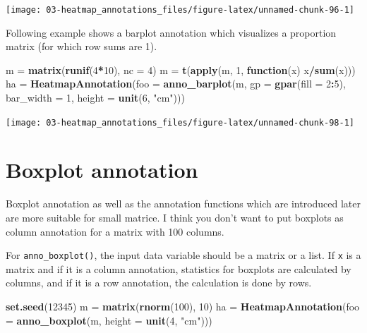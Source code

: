 \documentclass[]{book}
\newenvironment{Shaded}{\begin{snugshade}}{\end{snugshade}}
\newcommand{\KeywordTok}[1]{\textcolor[rgb]{0.13,0.29,0.53}{\textbf{#1}}}
\newcommand{\DataTypeTok}[1]{\textcolor[rgb]{0.13,0.29,0.53}{#1}}
\newcommand{\DecValTok}[1]{\textcolor[rgb]{0.00,0.00,0.81}{#1}}
\newcommand{\StringTok}[1]{\textcolor[rgb]{0.31,0.60,0.02}{#1}}
\newcommand{\ControlFlowTok}[1]{\textcolor[rgb]{0.13,0.29,0.53}{\textbf{#1}}}
\newcommand{\OperatorTok}[1]{\textcolor[rgb]{0.81,0.36,0.00}{\textbf{#1}}}
\newcommand{\NormalTok}[1]{#1}
\theoremstyle{definition}
\theoremstyle{definition}
\theoremstyle{definition}
\theoremstyle{remark}
\begin{document}
\begin{center}\texttt{[image: 03-heatmap\_annotations\_files/figure-latex/unnamed-chunk-96-1]} \end{center}

Following example shows a barplot annotation which visualizes a
proportion matrix (for which row sums are 1).

\begin{Shaded}
\begin{Highlighting}[]
\NormalTok{m =}\StringTok{ }\KeywordTok{matrix}\NormalTok{(}\KeywordTok{runif}\NormalTok{(}\DecValTok{4}\OperatorTok{*}\DecValTok{10}\NormalTok{), }\DataTypeTok{nc =} \DecValTok{4}\NormalTok{)}
\NormalTok{m =}\StringTok{ }\KeywordTok{t}\NormalTok{(}\KeywordTok{apply}\NormalTok{(m, }\DecValTok{1}\NormalTok{, }\ControlFlowTok{function}\NormalTok{(x) x}\OperatorTok{/}\KeywordTok{sum}\NormalTok{(x)))}
\NormalTok{ha =}\StringTok{ }\KeywordTok{HeatmapAnnotation}\NormalTok{(}\DataTypeTok{foo =} \KeywordTok{anno_barplot}\NormalTok{(m, }\DataTypeTok{gp =} \KeywordTok{gpar}\NormalTok{(}\DataTypeTok{fill =} \DecValTok{2}\OperatorTok{:}\DecValTok{5}\NormalTok{), }
    \DataTypeTok{bar_width =} \DecValTok{1}\NormalTok{, }\DataTypeTok{height =} \KeywordTok{unit}\NormalTok{(}\DecValTok{6}\NormalTok{, }\StringTok{"cm"}\NormalTok{)))}
\end{Highlighting}
\end{Shaded}

\begin{center}\texttt{[image: 03-heatmap\_annotations\_files/figure-latex/unnamed-chunk-98-1]} \end{center}

\section{Boxplot annotation}\label{box-annotation}

Boxplot annotation as well as the annotation functions which are
introduced later are more suitable for small matrice. I think you don't
want to put boxplots as column annotation for a matrix with 100 columns.

For \texttt{anno\_boxplot()}, the input data variable should be a matrix
or a list. If \texttt{x} is a matrix and if it is a column annotation,
statistics for boxplots are calculated by columns, and if it is a row
annotation, the calculation is done by rows.

\begin{Shaded}
\begin{Highlighting}[]
\KeywordTok{set.seed}\NormalTok{(}\DecValTok{12345}\NormalTok{)}
\NormalTok{m =}\StringTok{ }\KeywordTok{matrix}\NormalTok{(}\KeywordTok{rnorm}\NormalTok{(}\DecValTok{100}\NormalTok{), }\DecValTok{10}\NormalTok{)}
\NormalTok{ha =}\StringTok{ }\KeywordTok{HeatmapAnnotation}\NormalTok{(}\DataTypeTok{foo =} \KeywordTok{anno_boxplot}\NormalTok{(m, }\DataTypeTok{height =} \KeywordTok{unit}\NormalTok{(}\DecValTok{4}\NormalTok{, }\StringTok{"cm"}\NormalTok{)))}
\end{Highlighting}
\end{Shaded}
\end{document}
